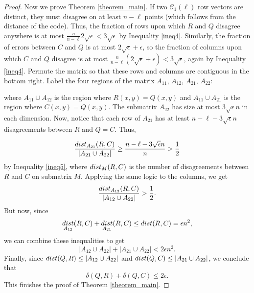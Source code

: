 \documentclass[11pt]{article}
\newcommand{\C}{\mathcal{C}}
\newcommand{\dist}{\mathop{\rm dist}}
\begin{document}
\begin{proof}
Now we prove Theorem \ref{theorem_main}.
If two $\C_1(\ell)$ row vectors are distinct, they must disagree on at least $n - \ell$ points (which follows from the distance of the code). Thus, the fraction of rows upon which $R$ and $Q$ disagree anywhere is at most $\frac{n}{n - \ell}2 \sqrt{\epsilon} < 3 \sqrt{\epsilon}$ by Inequality \eqref{ineq4}. Similarly, the fraction of errors between $C$ and $Q$ is at most $2\sqrt{\epsilon} + \epsilon$, so the fraction of columns upon which $C$ and $Q$ disagree is at most $\frac{n}{n - \ell}(2\sqrt{\epsilon} + \epsilon) < 3 \sqrt{\epsilon}$, again by Inequality \eqref{ineq4}. Permute the matrix so that these rows and columns are contiguous in the bottom right. Label the four regions of the matrix $A_{11}$, $A_{12}$, $A_{21}$, $A_{22}$:

\begin{center}
\end{center}

where $A_{11} \cup A_{12}$ is the region where $R(x,y) = Q(x,y)$ and $A_{11} \cup A_{21}$ is the region where $C(x,y) = Q(x,y)$. The submatrix $A_{22}$ has size at most $3\sqrt{\epsilon}n$ in each dimension. Now, notice that each row of $A_{21}$ has at least $n - \ell - 3\sqrt{\epsilon}n$ disagreements between $R$ and $Q = C$. Thus,

$$\frac{\dist_{A_{21}}(R, C)}{|A_{21} \cup A_{22}|} \geq \frac{n - \ell - 3\sqrt{\epsilon}n}{n} > \frac 12$$
by Inequality \eqref{ineq5}, where $\dist_M(R, C)$ is the number of disagreements between $R$ and $C$ on submatrix $M$.
Applying the same logic to the columns, we get 
$$\frac{\dist_{A_{12}}(R, C)}{|A_{12} \cup A_{22}|} > \frac 12.$$
But now, since
$$\dist_{A_{12}}(R,C) + \dist_{A_{21}}(R,C) \leq \dist(R,C) = \epsilon n^2,$$
we can combine these inequalities to get
$$|A_{12} \cup A_{22}| + |A_{21} \cup A_{22}| < 2\epsilon n^2.$$
Finally, since $\dist(Q, R) \leq |A_{12} \cup A_{22}|$ and $\dist(Q, C) \leq |A_{21} \cup A_{22}|$, we conclude that
$$\delta(Q, R) + \delta(Q, C) \leq 2\epsilon.$$
This finishes the proof of Theorem \ref{theorem_main}.
\end{proof}
\end{document}
